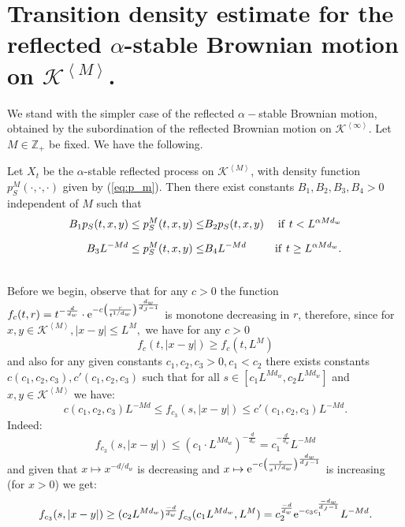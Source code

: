 \documentclass[11pt]{article}
\begin{document}
\section{Transition density estimate for the reflected $\alpha$-stable Brownian motion on $\mathcal{K}^{\left\langle M \right\rangle}$.}
We stand with the simpler case of the reflected $\alpha-$stable Brownian motion, obtained by  the subordination of the reflected Brownian motion on $\mathcal{K}^{\left\langle \infty \right\rangle}.$  Let $M \in \mathbb{Z_+}$ be fixed. We have the following.
\begin{theo}\label{th:g_m_stable}
Let $X_{t}$ be the $\alpha$-stable reflected process on $\mathcal{K}^{\left\langle M \right\rangle}$, with density function $p^M_S(\cdot, \cdot, \cdot)$ given by  (\ref{eq:p_m}). Then there exist constants $B_1, B_2, B_3, B_4 > 0$ independent of $M$ such that
\begin{eqnarray*}
B_1p_{S}(t,x,y)  \leq  p^M_S(t,x,y) \leq & B_2p_{S}(t,x,y) & \rm{ if } \textrm{ $t<L^{\alpha Md_{w}}$} \\[2mm]
B_3L^{-Md}  \leq  p^M_S(t,x,y)  \leq & B_4L^{-Md} & \rm{ if } \textrm{ $t \geq L^{\alpha Md_{w}}.$} \\
\end{eqnarray*}
\end{theo}
\\
Before we begin, observe that
for any $c > 0$ the function $f_c(t,r)=t^{-\frac{d}{d_{w}}} \cdot {\rm e}^{-c\left(\frac{r}{t^{1/d_w}}\right)^\frac{d_w}{{d_{J}-1}}}$ is monotone decreasing in $r$, therefore, since for $x,y \in \mathcal{K}^{\left\langle M \right\rangle}, |x-y| \leq L^{M}, $ we have for any $c > 0$
$$
f_{c}(t,|x-y|) \geq f_{c}(t,L^{M})
$$
and also for any given constants $c_1, c_2, c_3 >0, c_1 < c_2$ there exists constants $c(c_{1},c_{2},c_{3}),c'(c_{1},c_{2},c_{3})$ such that for all  $ s \in [ c_{1} L^{Md_{w}},c_{2}L^{Md_{w}}]$ and $x,y \in \mathcal{K}^{\left\langle M \right\rangle}$ we have:
\begin{equation}\label{eq:f estimate}
c(c_{1},c_{2},c_{3})L^{-Md} \leq f_{c_{3}}(s,|x-y|) \leq c'(c_{1},c_{2},c_{3})L^{-Md}.
\end{equation}
Indeed:
$$
f_{c_{3}}(s,|x-y|) \leq (c_{1} \cdot L^{Md_{w}})^{-\frac{d}{d_{w}}} = c_{1}^{-\frac{d}{d_{w}}}L^{-Md}
$$
and given that $x \mapsto x^{-d/d_w}$ is decreasing and $x \mapsto {\rm e}^{-c\left(\frac{r}{x^{1/d_w}}\right)^\frac{d_w}{{d_{J}-1}}} $ is increasing (for $x > 0$) we get:
$$
f_{c_{3}}(s,|x-y|) \geq (c_{2}L^{Md_w})^{\frac{-d}{d_{w}}}f_{c_{3}}(c_{1}L^{Md_{w}},L^{M}) = c_{2}^{\frac{-d}{d_{w}}}{\rm e}^{-c_{3}c_{1}^{\frac{-d_w}{d_J-1}}}L^{-Md}.
$$
\end{document}
